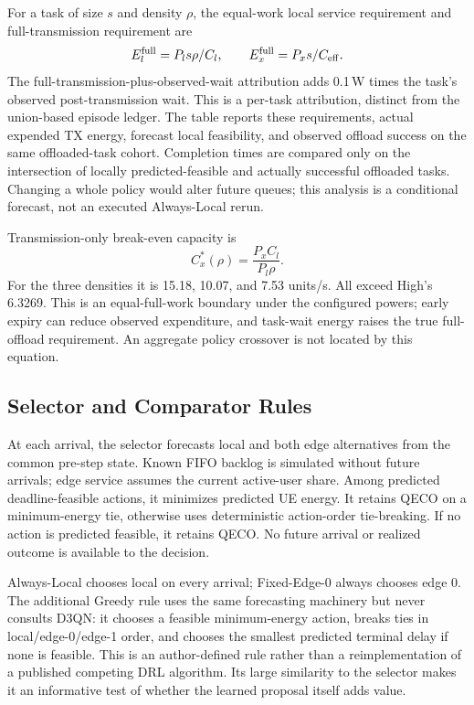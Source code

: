 \documentclass[conference]{IEEEtran}
\begin{document}
For a task of size $s$ and density $\rho$, the equal-work local service requirement and full-transmission requirement are
\begin{equation}
E_l^{\rm full}=P_l s\rho/C_l,\qquad E_x^{\rm full}=P_x s/C_{\rm eff}.
\label{eq:matched}
\end{equation}
The full-transmission-plus-observed-wait attribution adds 0.1\,W times the task's observed post-transmission wait. This is a per-task attribution, distinct from the union-based episode ledger. The table reports these requirements, actual expended TX energy, forecast local feasibility, and observed offload success on the same offloaded-task cohort. Completion times are compared only on the intersection of locally predicted-feasible and actually successful offloaded tasks. Changing a whole policy would alter future queues; this analysis is a conditional forecast, not an executed Always-Local rerun.

Transmission-only break-even capacity is
\begin{equation}
C_x^*(\rho)=\frac{P_xC_l}{P_l\rho}.
\label{eq:crossover}
\end{equation}
For the three densities it is 15.18, 10.07, and 7.53 units/s. All exceed High's 6.3269. This is an equal-full-work boundary under the configured powers; early expiry can reduce observed expenditure, and task-wait energy raises the true full-offload requirement. An aggregate policy crossover is not located by this equation.

\subsection{Selector and Comparator Rules}
At each arrival, the selector forecasts local and both edge alternatives from the common pre-step state. Known FIFO backlog is simulated without future arrivals; edge service assumes the current active-user share. Among predicted deadline-feasible actions, it minimizes predicted UE energy. It retains QECO on a minimum-energy tie, otherwise uses deterministic action-order tie-breaking. If no action is predicted feasible, it retains QECO. No future arrival or realized outcome is available to the decision.

Always-Local chooses local on every arrival; Fixed-Edge-0 always chooses edge 0. The additional Greedy rule uses the same forecasting machinery but never consults D3QN: it chooses a feasible minimum-energy action, breaks ties in local/edge-0/edge-1 order, and chooses the smallest predicted terminal delay if none is feasible. This is an author-defined rule rather than a reimplementation of a published competing DRL algorithm. Its large similarity to the selector makes it an informative test of whether the learned proposal itself adds value.
\end{document}
